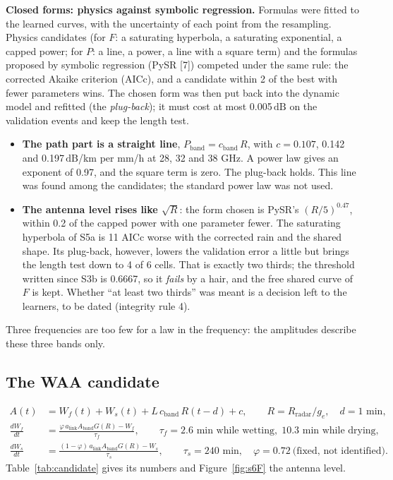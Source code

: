 \documentclass[11pt,a4paper]{article}
\newcommand{\dB}{\,\mathrm{dB}}
\begin{document}
\textbf{Closed forms: physics against symbolic regression.} Formulas were fitted to the learned curves, with the
uncertainty of each point from the resampling. Physics candidates (for $F$: a saturating hyperbola, a saturating
exponential, a capped power; for $P$: a line, a power, a line with a square term) and the formulas proposed by
symbolic regression (PySR [7]) competed under the same rule: the corrected Akaike criterion (AICc), and a candidate
within 2 of the best with fewer parameters wins. The chosen form was then put back into the dynamic model and refitted
(the \emph{plug-back}); it must cost at most 0.005$\dB$ on the validation events and keep the length test.
\begin{itemize}
\item \textbf{The path part is a straight line}, $P_{\mathrm{band}} = c_{\mathrm{band}}\,R$, with $c = 0.107$, 0.142
and 0.197$\dB$/km per mm/h at 28, 32 and 38 GHz. A power law gives an exponent of 0.97, and the square term is zero.
The plug-back holds. This line was found among the candidates; the standard power law was not used.
\item \textbf{The antenna level rises like $\sqrt{R}$}: the form chosen is PySR's $(R/5)^{0.47}$, within 0.2 of the
capped power with one parameter fewer. The saturating hyperbola of S5a is 11 AICc worse with the corrected rain and
the shared shape. Its plug-back, however, lowers the validation error a little but brings the length test down to 4 of
6 cells. That is exactly two thirds; the threshold written since S3b is 0.6667, so it \emph{fails} by a hair, and the
free shared curve of $F$ is kept. Whether ``at least two thirds'' was meant is a decision left to the learners, to be
dated (integrity rule 4).
\end{itemize}
Three frequencies are too few for a law in the frequency: the amplitudes describe these three bands only.

\subsection{The WAA candidate}
\label{sec:candidate}

\begin{equation}
\begin{aligned}
A(t) &= W_f(t) + W_s(t) + L\,c_{\mathrm{band}}\,R(t-d) + c, \qquad R = R_{\mathrm{radar}}/g_e,\quad d = 1 \text{ min}, \\
\frac{dW_f}{dt} &= \frac{\varphi\,a_{\mathrm{link}}A_{\mathrm{band}}G(R) - W_f}{\tau_f}, \qquad
\tau_f = 2.6 \text{ min while wetting},\; 10.3 \text{ min while drying}, \\
\frac{dW_s}{dt} &= \frac{(1-\varphi)\,a_{\mathrm{link}}A_{\mathrm{band}}G(R) - W_s}{\tau_s}, \qquad
\tau_s = 240 \text{ min},\quad \varphi = 0.72 \ \text{(fixed, not identified)}.
\end{aligned}
\label{eq:candidate}
\end{equation}
Table~\ref{tab:candidate} gives its numbers and Figure~\ref{fig:s6F} the antenna level.
\end{document}
